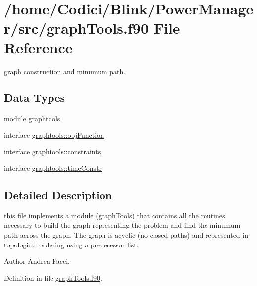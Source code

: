 \hypertarget{graph_tools_8f90}{\section{/home/\-Codici/\-Blink/\-Power\-Manager/src/graph\-Tools.f90 File Reference}
\label{graph_tools_8f90}
}


graph construction and minumum path.  


\subsection*{Data Types}
\begin{DoxyCompactItemize}
\item 
module \hyperlink{classgraphtools}{graphtools}
\item 
interface \hyperlink{interfacegraphtools_1_1obj_function}{graphtools\-::obj\-Function}
\item 
interface \hyperlink{interfacegraphtools_1_1constraints}{graphtools\-::constraints}
\item 
interface \hyperlink{interfacegraphtools_1_1time_constr}{graphtools\-::time\-Constr}
\end{DoxyCompactItemize}


\subsection{Detailed Description}
this file implements a module (graph\-Tools) that contains all the routines necessary to build the graph representing the problem and find the minumum path across the graph. The graph is acyclic (no closed paths) and represented in topological ordering using a predecessor list. \begin{DoxyAuthor}{Author}
Andrea Facci. 
\end{DoxyAuthor}


Definition in file \hyperlink{graph_tools_8f90_source}{graph\-Tools.\-f90}.

